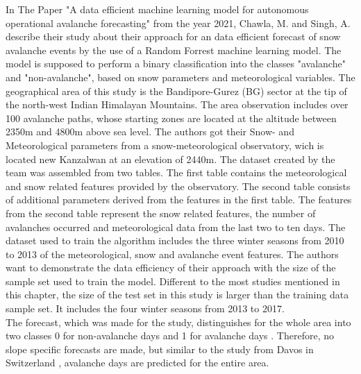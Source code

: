 \documentclass[../masterarbeit.tex]{subfiles}
\begin{document}
In The Paper "A data efficient machine learning model for autonomous operational avalanche forecasting" \textcite[]{nhess-2021-106} from the year 2021, Chawla, M. and Singh, A. describe their study about their approach for an data efficient forecast of snow avalanche events by the use of a Random Forrest machine learning model. The model is supposed to perform a binary classification into the classes "avalanche" and "non-avalanche", based on snow parameters and meteorological variables. 
The geographical area of this study is the Bandipore-Gurez (BG) sector at the tip of the north-west Indian Himalayan Mountains. The area observation includes over 100 avalanche paths, whose starting zones are located at the altitude between 2350m and 4800m above sea level. The authors got their Snow- and Meteorological parameters from a snow-meteorological observatory, wich is located new Kanzalwan at an elevation of 2440m. The dataset created by the team was assembled from two tables. The first table contains the meteorological and snow related features provided by the observatory. The second table consists of additional parameters derived from the features in the first table. The features from the second table represent the snow related features, the number of avalanches occurred and meteorological data from the last two to ten days. The dataset used to train the algorithm includes the three winter seasons from 2010 to 2013 of the meteorological, snow and avalanche event features. The authors want to demonstrate the data efficiency of their approach with the size of the sample set used to train the model.  Different to the most studies mentioned in this chapter, the size of the test set in this study is larger than the training data sample set. It includes the four winter seasons from 2013 to 2017. \autocite[]{nhess-2021-106} \\
The forecast, which was made for the study, distinguishes for the whole area into two classes 0 for non-avalanche days and 1 for avalanche days \textcite[]{nhess-2021-106}. Therefore, no slope specific forecasts are made, but similar to the study from Davos in Switzerland \textcite[]{Harvey:2016}, avalanche days are predicted for the entire area. \\
\end{document}

